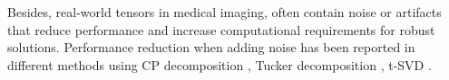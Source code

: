 Besides, real-world tensors in medical imaging, often contain noise or artifacts that reduce performance and increase computational requirements for robust solutions. Performance reduction when adding noise has been reported in different methods using CP decomposition \cite{zhao2023robust}, Tucker decomposition \cite{prevost2020hyperspectral}, t-SVD \cite{liu2025dynamic}.

